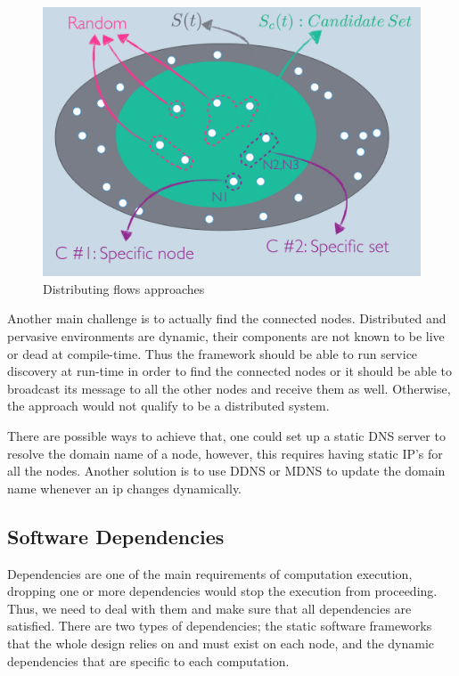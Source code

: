  \begin{figure}[H]
 	\centering
 	\includegraphics[scale=0.45]{images/set.png} 
 	\caption{Distributing flows approaches}
 	\label{fig:distributing-flows}
 \end{figure}

Another main challenge is to actually find the connected nodes. Distributed and pervasive environments are dynamic, their components are not known to be live or dead at compile-time. Thus the framework should be able to run service discovery at run-time in order to find the connected nodes or it should be able to broadcast its message to all the other nodes and receive them as well. Otherwise, the approach would not qualify to be a distributed system. 

There are possible ways to achieve that, one could set up a static DNS server to resolve the domain name of a node, however, this requires having static IP's for all the nodes. Another solution is to use DDNS or MDNS to update the domain name whenever an ip changes dynamically.









\subsection{Software Dependencies}

Dependencies are one of the main requirements of computation execution, dropping one or more dependencies would stop the execution from proceeding. Thus, we need to deal with them and make sure that all dependencies are satisfied.  There are two types of dependencies; the static software frameworks that the whole design relies on and must exist on each node, and the dynamic dependencies that are specific to each computation.

